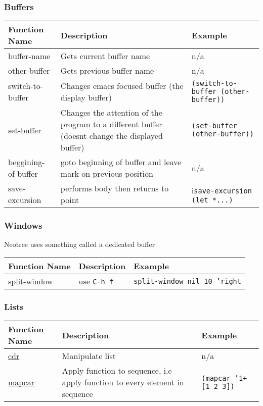 \documentclass[12pt, letterpaper]{article}
\def\code#1{\texttt{#1}}
\begin{document}
\subsubsection{Buffers}
\begin{tabular} {|L{0.2\textwidth}|L{0.4\textwidth}|L{0.4\textwidth}|}
  \hline
  \textbf{Function Name} &
  \textbf{Description} &
  \textbf{Example} \\\hline\hline
  buffer-name & Gets current buffer name & n/a  \\\hline
  other-buffer & Gets previous buffer name & n/a  \\\hline
  switch-to-buffer & Changes emacs focused buffer (the display buffer) & \code{(switch-to-buffer (other-buffer))} \\\hline
  set-buffer & Changes the attention of the program to a different buffer (doesnt change the displayed buffer) & \code{(set-buffer (other-buffer))} \\\hline
  beggining-of-buffer & goto beginning of buffer and leave mark on previous position & n/a \\\hline
  save-excursion & performs body then returns to point & i\code{save-excursion (let *...)} \\\hline
\end{tabular}

\subsubsection{Windows}
Neotree uses something called a dedicated buffer
\begin{tabular} {|L{0.2\textwidth}|L{0.4\textwidth}|L{0.4\textwidth}|}
  \hline
  \textbf{Function Name} &
  \textbf{Description} &
  \textbf{Example} \\\hline\hline
  split-window & use \code{C-h f} & \code{split-window nil 10 'right} \\\hline
\end{tabular}

\subsubsection{Lists}
\begin{tabular} {|L{0.2\textwidth}|L{0.4\textwidth}|L{0.4\textwidth}|}
  \hline
  \textbf{Function Name} &
  \textbf{Description} &
  \textbf{Example} \\\hline\hline
  \href{https://www.gnu.org/software/emacs/manual/html_node/eintr/car-cdr-_0026-cons.html}{cdr} & Manipulate list & n/a \\\hline
  \href{https://www.gnu.org/software/emacs/manual/html_node/elisp/Mapping-Functions.html}{mapcar} & Apply function to sequence, i.e apply function to every element in sequence & \code{(mapcar '1+ [1 2 3])} \\\hline
\end{tabular}
\end{document}
